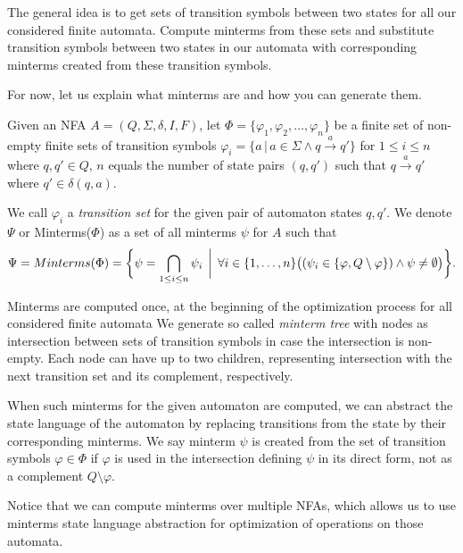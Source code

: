 The general idea is to get sets of transition symbols between two states for all our considered finite automata. Compute minterms from these sets and substitute transition symbols between two states in our automata with corresponding minterms created from these transition symbols.

For now, let us explain what minterms are and how you can generate them.

\begin{definition} \hfill \newline
Given an NFA $A = (Q, \Sigma, \delta, I, F)$, let $\Phi = \{ \varphi_1, \varphi_2, \ldots, \varphi_n \}$ be a finite set of non-empty finite sets of transition symbols $\varphi_i = \{ a \,\vert\, a \in \Sigma \land q \xrightarrow{a} q' \}$ for $ 1 \leq i \leq n$ where $q, q' \in Q$, $n$ equals the number of state pairs $(q, q')$ such that $q \xrightarrow{a} q'$ where $q' \in \delta(q, a)$.
\end{definition}

We call $\varphi_i$ a \emph{transition  set} for the given pair of automaton states $q, q'$. We denote $\Psi$ or Minterms($\Phi$) as a set of all minterms $\psi$ for $A$ such that
\[
    \Psi = Minterms(\Phi) = \biggl\{ \psi = \bigcap_{1 \leq i \leq n} \psi_i \,\biggm|\,
    \forall i \in \{1, \dots, n\} \bigl( (\psi_i \in \{ \varphi, Q \setminus \varphi \}) \land \psi \neq \emptyset \bigr) \biggr\} \text{.}
\]

Minterms are computed once, at the beginning of the optimization process for all considered finite automata
We generate so called \emph{minterm tree} with nodes as intersection between sets of transition symbols in case the intersection is non-empty. Each node can have up to two children, representing intersection with the next transition set and its complement, respectively.

When such minterms for the given automaton are computed, we can abstract the state language of the automaton by replacing transitions from the state by their corresponding minterms. We say minterm $\psi$ is created from the set of transition symbols $\varphi \in \Phi$ if $\varphi$ is used in the intersection defining $\psi$ in its direct form, not as a complement $Q \setminus \varphi$.

Notice that we can compute minterms over multiple NFAs, which allows us to use minterms state language abstraction for optimization of operations on those automata.

